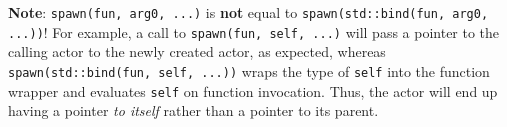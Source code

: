 \textbf{Note}: \lstinline^spawn(fun, arg0, ...)^ is \textbf{not} equal to \lstinline^spawn(std::bind(fun, arg0, ...))^!
For example, a call to \lstinline^spawn(fun, self, ...)^ will pass a pointer to the calling actor to the newly created actor, as expected, whereas \lstinline^spawn(std::bind(fun, self, ...))^ wraps the type of \lstinline^self^ into the function wrapper and evaluates \lstinline^self^ on function invocation.
Thus, the actor will end up having a pointer \emph{to itself} rather than a pointer to its parent.
